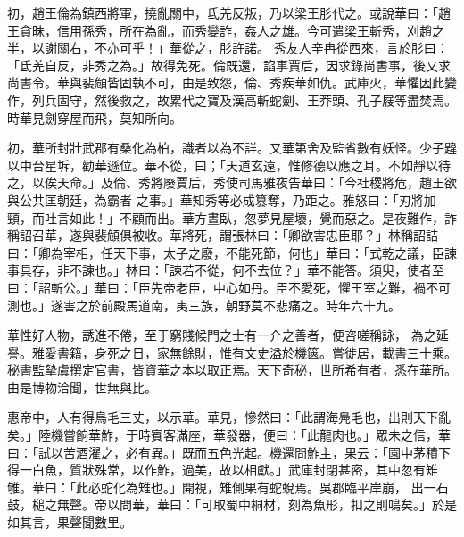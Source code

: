 \begin{pinyinscope}
 初，趙王倫為鎮西將軍，撓亂關中，氐羌反叛，乃以梁王肜代之。或說華曰：「趙王貪昧，信用孫秀，所在為亂，而秀變詐，姦人之雄。今可遣梁王斬秀，刈趙之半，以謝關右，不亦可乎！」華從之，肜許諾。
 秀友人辛冉從西來，言於肜曰：「氐羌自反，非秀之為。」故得免死。倫既還，諂事賈后，因求錄尚書事，後又求尚書令。華與裴頠皆固執不可，由是致怨，倫、秀疾華如仇。武庫火，華懼因此變作，列兵固守，然後救之，故累代之寶及漢高斬蛇劍、王莽頭、孔子屐等盡焚焉。時華見劍穿屋而飛，莫知所向。



 初，華所封壯武郡有桑化為柏，識者以為不詳。又華第舍及監省數有妖怪。少子韙以中台星坼，勸華遜位。華不從，曰；「天道玄遠，惟修德以應之耳。不如靜以待之，以俟天命。」及倫、秀將廢賈后，秀使司馬雅夜告華曰：「今社稷將危，趙王欲與公共匡朝廷，為霸者
 之事。」華知秀等必成篡奪，乃距之。雅怒曰：「刃將加頸，而吐言如此！」不顧而出。華方晝臥，忽夢見屋壞，覺而惡之。是夜難作，詐稱詔召華，遂與裴頠俱被收。華將死，謂張林曰：「卿欲害忠臣耶？」林稱詔詰曰：「卿為宰相，任天下事，太子之廢，不能死節，何也」華曰：「式乾之議，臣諫事具存，非不諫也。」林曰：「諫若不從，何不去位？」華不能答。須臾，使者至曰：「詔斬公。」華曰：「臣先帝老臣，中心如丹。臣不愛死，懼王室之難，禍不可測也。」遂害之於前殿馬道南，夷三族，朝野莫不悲痛之。時年六十九。



 華性好人物，誘進不倦，至于窮賤候門之士有一介之善者，便咨嗟稱詠，
 為之延譽。雅愛書籍，身死之日，家無餘財，惟有文史溢於機篋。嘗徙居，載書三十乘。秘書監摯虞撰定官書，皆資華之本以取正焉。天下奇秘，世所希有者，悉在華所。由是博物洽聞，世無與比。



 惠帝中，人有得鳥毛三丈，以示華。華見，慘然曰：「此謂海鳧毛也，出則天下亂矣。」陸機嘗餉華鮓，于時賓客滿座，華發器，便曰：「此龍肉也。」眾未之信，華曰：「試以苦酒濯之，必有異。」既而五色光起。機還問鮓主，果云：「園中茅積下得一白魚，質狀殊常，以作鮓，過美，故以相獻。」武庫封閉甚密，其中忽有雉雊。華曰：「此必蛇化為雉也。」開視，雉側果有蛇蛻焉。吳郡臨平岸崩，
 出一石鼓，槌之無聲。帝以問華，華曰：「可取蜀中桐材，刻為魚形，扣之則鳴矣。」於是如其言，果聲聞數里。




\end{pinyinscope}
